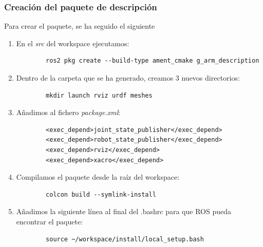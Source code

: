 \subsubsection{Creación del paquete de descripción}
\noindent Para crear el paquete, se ha seguido el siguiente
\begin{enumerate}
    \item En el \textit{src} del workspace ejecutamos:
    \begin{verbatim}
        ros2 pkg create --build-type ament_cmake g_arm_description
    \end{verbatim}   
    \item Dentro de la carpeta que se ha generado, creamos 3 nuevos directorios:
    \begin{verbatim}
        mkdir launch rviz urdf meshes
    \end{verbatim} 
        
    \item Añadimos al fichero \textit{package.xml}: 
    
    \begin{lstlisting}
        <exec_depend>joint_state_publisher</exec_depend>
        <exec_depend>robot_state_publisher</exec_depend>
        <exec_depend>rviz</exec_depend>
        <exec_depend>xacro</exec_depend>
    \end{lstlisting}
    
    \item Compilamos el paquete desde la raíz del workspace:
    \begin{verbatim}
        colcon build --symlink-install
    \end{verbatim}
    \item Añadimos la siguiente línea al final del .bashrc para que ROS pueda encontrar el paquete:
    \begin{verbatim}
        source ~/workspace/install/local_setup.bash
    \end{verbatim}
    
    \end{enumerate}

